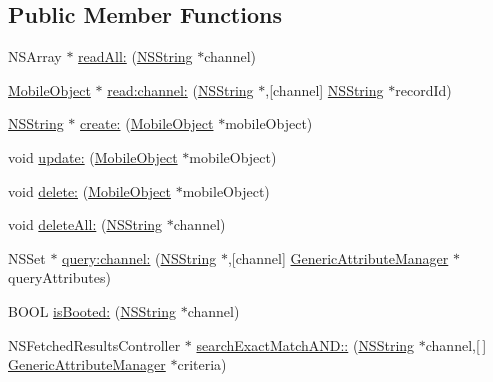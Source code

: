 \subsection*{\-Public \-Member \-Functions}
\begin{DoxyCompactItemize}
\item 
\-N\-S\-Array $\ast$ \hyperlink{interface_mobile_object_database_a4fbb5cddb8146e261cc2212c8d90debb}{read\-All\-:} (\hyperlink{class_n_s_string}{\-N\-S\-String} $\ast$channel)
\item 
\hyperlink{interface_mobile_object}{\-Mobile\-Object} $\ast$ \hyperlink{interface_mobile_object_database_a10cf83decc48908861d17d9f0141ab18}{read\-:channel\-:} (\hyperlink{class_n_s_string}{\-N\-S\-String} $\ast$,\mbox{[}channel\mbox{]} \hyperlink{class_n_s_string}{\-N\-S\-String} $\ast$record\-Id)
\item 
\hyperlink{class_n_s_string}{\-N\-S\-String} $\ast$ \hyperlink{interface_mobile_object_database_aeefe5c8508be5e856f06fe8226c44904}{create\-:} (\hyperlink{interface_mobile_object}{\-Mobile\-Object} $\ast$mobile\-Object)
\item 
void \hyperlink{interface_mobile_object_database_a4018487d7568877e05d30503528867b0}{update\-:} (\hyperlink{interface_mobile_object}{\-Mobile\-Object} $\ast$mobile\-Object)
\item 
void \hyperlink{interface_mobile_object_database_ae94e66a2126bb5fd86f15b378a2a2f08}{delete\-:} (\hyperlink{interface_mobile_object}{\-Mobile\-Object} $\ast$mobile\-Object)
\item 
void \hyperlink{interface_mobile_object_database_aa48df42f15b752f96c70061ff587b793}{delete\-All\-:} (\hyperlink{class_n_s_string}{\-N\-S\-String} $\ast$channel)
\item 
\-N\-S\-Set $\ast$ \hyperlink{interface_mobile_object_database_a7cfe2fde7fad0c56172554905c73915d}{query\-:channel\-:} (\hyperlink{class_n_s_string}{\-N\-S\-String} $\ast$,\mbox{[}channel\mbox{]} \hyperlink{interface_generic_attribute_manager}{\-Generic\-Attribute\-Manager} $\ast$query\-Attributes)
\item 
\-B\-O\-O\-L \hyperlink{interface_mobile_object_database_a1315f90285e14cb44723fb58009da920}{is\-Booted\-:} (\hyperlink{class_n_s_string}{\-N\-S\-String} $\ast$channel)
\item 
\-N\-S\-Fetched\-Results\-Controller $\ast$ \hyperlink{interface_mobile_object_database_ab373b1d44e71739b9eb0009f9a91b693}{search\-Exact\-Match\-A\-N\-D\-::} (\hyperlink{class_n_s_string}{\-N\-S\-String} $\ast$channel,\mbox{[}$\,$\mbox{]} \hyperlink{interface_generic_attribute_manager}{\-Generic\-Attribute\-Manager} $\ast$criteria)

\end{DoxyCompactItemize}
